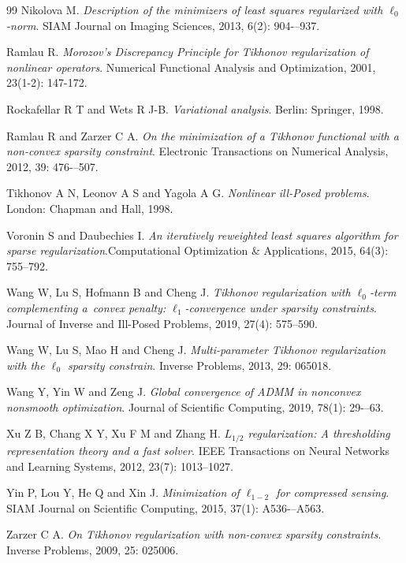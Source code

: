 \documentclass[a4paper,12pt]{article}
\numberwithin{equation}{section}
\begin{document}
\begin{thebibliography}{99}
Nikolova M. \emph{Description of the minimizers of least squares regularized with $\ell_{0}$-norm}. SIAM Journal on Imaging Sciences, 2013, 6(2): 904-–937.


Ramlau R. \emph{Morozov's Discrepancy Principle for Tikhonov regularization of nonlinear operators}. Numerical Functional Analysis and Optimization, 2001, 23(1-2): 147-172.

Rockafellar R T and Wets R J-B. \emph{Variational analysis}. Berlin: Springer, 1998.

Ramlau R and Zarzer C A. \emph{On the minimization of a Tikhonov functional with a non-convex sparsity constraint}. Electronic Transactions on Numerical Analysis, 2012, 39: 476-–507.

Tikhonov A N, Leonov A S and Yagola A G. \emph{Nonlinear ill-Posed problems}. London: Chapman and Hall, 1998.

Voronin S and Daubechies I. \emph{An iteratively reweighted least squares algorithm for sparse regularization}.Computational Optimization \& Applications, 2015, 64(3): 755--792.

Wang W, Lu S, Hofmann B and Cheng J. \emph{Tikhonov regularization with $\ell_{0}$-term complementing a~convex penalty: $\ell_{1}$-convergence under sparsity constraints}. Journal of Inverse and Ill-Posed Problems, 2019, 27(4): 575--590.

Wang W, Lu S, Mao H and Cheng J. \emph{Multi-parameter Tikhonov regularization with the $\ell_{0}$ sparsity constrain}. Inverse Problems, 2013, 29: 065018.

Wang Y, Yin W and Zeng J. \emph{Global convergence of ADMM in nonconvex nonsmooth optimization}. Journal of Scientific Computing, 2019, 78(1): 29-–63.

Xu Z B, Chang X Y, Xu F M and Zhang H. \emph{$L_{1/2}$ regularization: A thresholding representation theory and a fast solver}. IEEE Transactions on Neural Networks and Learning Systems, 2012, 23(7): 1013--1027.

Yin P, Lou Y, He Q and Xin J. \emph{Minimization of $\ell_{1-2}$ for compressed sensing}. SIAM Journal on Scientific Computing, 2015, 37(1): A536-–A563.

Zarzer C A. \emph{On Tikhonov regularization with non-convex sparsity constraints}. Inverse Problems, 2009, 25: 025006.

\end{thebibliography}
\end{document}
